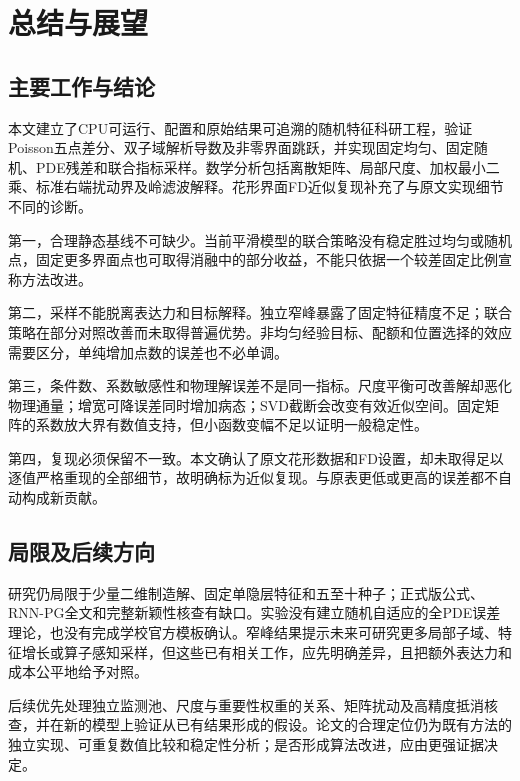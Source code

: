 \chapter{总结与展望}
\section{主要工作与结论}
本文建立了CPU可运行、配置和原始结果可追溯的随机特征科研工程，验证Poisson五点差分、双子域解析导数及非零界面跳跃，并实现固定均匀、固定随机、PDE残差和联合指标采样。数学分析包括离散矩阵、局部尺度、加权最小二乘、标准右端扰动界及岭滤波解释。花形界面FD近似复现补充了与原文实现细节不同的诊断。

第一，合理静态基线不可缺少。当前平滑模型的联合策略没有稳定胜过均匀或随机点，固定更多界面点也可取得消融中的部分收益，不能只依据一个较差固定比例宣称方法改进。

第二，采样不能脱离表达力和目标解释。独立窄峰暴露了固定特征精度不足；联合策略在部分对照改善而未取得普遍优势。非均匀经验目标、配额和位置选择的效应需要区分，单纯增加点数的误差也不必单调。

第三，条件数、系数敏感性和物理解误差不是同一指标。尺度平衡可改善解却恶化物理通量；增宽可降误差同时增加病态；SVD截断会改变有效近似空间。固定矩阵的系数放大界有数值支持，但小函数变幅不足以证明一般稳定性。

第四，复现必须保留不一致。本文确认了原文花形数据和FD设置，却未取得足以逐值严格重现的全部细节，故明确标为近似复现。与原表更低或更高的误差都不自动构成新贡献。

\section{局限及后续方向}
研究仍局限于少量二维制造解、固定单隐层特征和五至十种子；正式版公式、RNN-PG全文和完整新颖性核查有缺口。实验没有建立随机自适应的全PDE误差理论，也没有完成学校官方模板确认。窄峰结果提示未来可研究更多局部子域、特征增长或算子感知采样，但这些已有相关工作\cite{ag,christoffel,schwarzpreprint}，应先明确差异，且把额外表达力和成本公平地给予对照。

后续优先处理独立监测池、尺度与重要性权重的关系、矩阵扰动及高精度抵消核查，并在新的模型上验证从已有结果形成的假设。论文的合理定位仍为既有方法的独立实现、可重复数值比较和稳定性分析；是否形成算法改进，应由更强证据决定。
